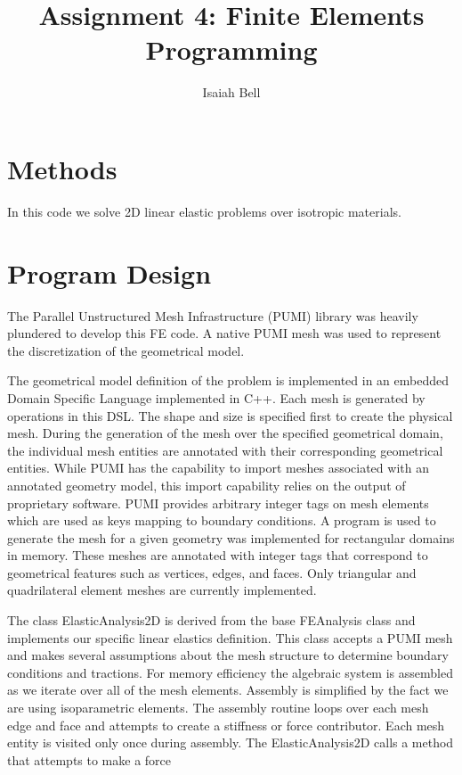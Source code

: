 \documentclass{article}
\begin{document}
\title{Assignment 4: Finite Elements Programming}
\author{Isaiah Bell} 
\maketitle

\section{Methods}

In this code we solve 2D linear elastic problems over isotropic materials.


\section{Program Design}

The Parallel Unstructured Mesh Infrastructure (PUMI) library was heavily plundered to develop this FE code. A native PUMI mesh was used to represent the discretization of the geometrical model.

The geometrical model definition of the problem is implemented in an embedded Domain Specific Language implemented in C++. Each mesh is generated by operations in this DSL. The shape and size is specified first to create the physical mesh. During the generation of the mesh over the specified geometrical domain, the individual mesh entities are annotated with their corresponding geometrical entities. While PUMI has the capability to import meshes associated with an annotated geometry model, this import capability relies on the output of proprietary software. PUMI provides arbitrary integer tags on mesh elements which are used as keys mapping to boundary conditions. A program is used to generate the mesh for a given geometry was implemented for rectangular domains in memory. These meshes are annotated with integer tags that correspond to geometrical features such as vertices, edges, and faces. Only triangular and quadrilateral element meshes are currently implemented.

The class ElasticAnalysis2D is derived from the base FEAnalysis class and implements
our specific linear elastics definition. This class accepts a PUMI mesh and makes
several assumptions about the mesh structure to determine boundary conditions and
tractions. For memory efficiency the algebraic system is assembled as we iterate over all of the mesh elements. Assembly is simplified by the fact we are using isoparametric elements. The assembly routine loops over each mesh edge and face and attempts to create a stiffness or force contributor. Each mesh entity is visited only once during assembly. The ElasticAnalysis2D calls a method that attempts to make a force 
\end{document}
